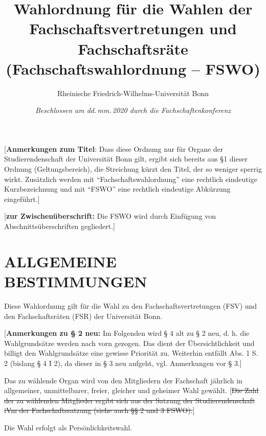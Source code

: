 \documentclass[%
draft,%
multilinesections%
]{fswo}
\newcommand\oldT[1] {{\color{Gray}[\st{#1}]}}
\newcommand\bemFr[1]{{\color{Red}[#1]}}
\newcommand\oldT[1]{}%
\newcommand\bemFr[1]{}%
\begin{document}
\title{Wahlordnung für die Wahlen der Fachschaftsvertretungen und Fachschaftsräte\\
(Fachschaftswahlordnung -- FSWO)}
\subtitle{Rheinische Friedrich-Wilhelms-Universität Bonn}
\author{}
\date{{\itshape\normalsize%
  Beschlossen am dd.\,mm.\,2020 durch die Fachschaftenkonferenz}}
\publishers{\itshape\normalsize%
  sowie am dd.\,mm.\,2020 durch das Studierendenparlament.}

\maketitle

\bemFr{\textbf{Anmerkungen zum Titel}: Dass diese Ordnung nur für Organe der Studierendenschaft der Universität Bonn gilt, ergibt sich bereits aus \S 1 dieser Ordnung (Geltungsbereich), die Streichung kürzt den Titel, der so weniger sperrig wirkt. Zusätzlich werden mit \enquote{Fachschaftswahlordnung} eine rechtlich eindeutige Kurzbezeichnung und mit \enquote{FSWO} eine rechtlich eindeutige Abkürzung eingeführt.}

\begingroup
\endgroup


\bemFr{\textbf{zur Zwischenüberschrift:} Die FSWO wird durch Einfügung von Abschnittsüberschriften gegliedert.}
\section{ALLGEMEINE BESTIMMUNGEN}

\begin{contract}
Diese Wahlordnung gilt für die Wahl zu den Fachschaftsvertretungen (FSV) und den Fachschaftsräten (FSR) der Universität Bonn.
\end{contract}

\bemFr{\textbf{Anmerkungen zu § 2 neu:}
Im Folgenden wird § 4 alt zu § 2 neu, d. h. die Wahlgrundsätze werden nach vorn gezogen.
Das dient der Übersichtlichkeit und billigt den Wahlgrundsätze eine gewisse Priorität zu.
Weiterhin entfällt Abs. 1 S. 2 (bislang § 4 I 2), da dieser in § 3 neu aufgeht, vgl. Anmerkungen vor § 3.}

\begin{contract}
Das zu wählende Organ wird von den Mitgliedern der Fachschaft jährlich in allgemeiner, unmittelbarer, freier, gleicher und geheimer Wahl gewählt. \oldT{Die Zahl der zu wählenden Mitglieder ergibt sich aus der Satzung der Studierendenschaft iVm der Fachschaftssatzung (siehe auch §§ 2 und 3 FSWO).}

Die Wahl erfolgt als Persönlichkeitswahl.
\end{contract}
\end{document}
